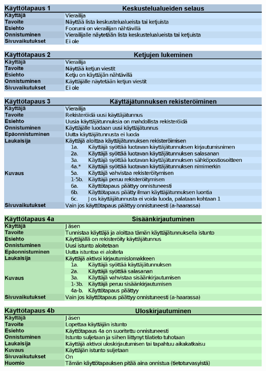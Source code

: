 \documentclass[11pt]{article}
\begin{document}
		\newpage
		\pagestyle{empty}
		\includegraphics[trim = 27mm 0mm 0mm 25mm]{kayttotapausmalli-sivu-1.eps}\\
\end{document}
